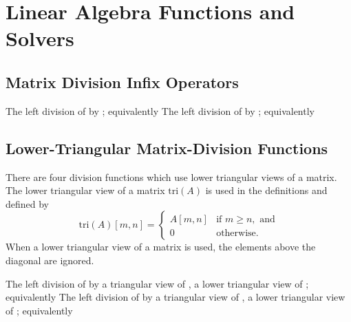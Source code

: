 \section{Linear Algebra Functions and Solvers}

\subsection{Matrix Division Infix Operators}
%
\begin{description}
%
%
%
The left division of  by ; equivalently
%
The left division of  by ; equivalently
%
\end{description}

\subsection{Lower-Triangular Matrix-Division Functions}

There are four division functions which use lower triangular views of
a matrix.  The lower triangular view of a matrix $\mbox{tri}(A)$ is
used in the definitions and defined by
\[
\mbox{tri}(A)[m,n] = 
\left\{
\begin{array}{ll}
A[m,n] & \mbox{if } m \geq n, \mbox{ and}
\\[4pt]
0 & \mbox{otherwise}.
\end{array}
\right.
\]
When a lower triangular view of a matrix is used, the elements above
the diagonal are ignored.

\begin{description}
%
%
%
%
The left division of  by a triangular view of
, a lower triangular view of ; equivalently
%
The left division of  by a triangular view of
, a lower triangular view of ; equivalently
%
\end{description}


